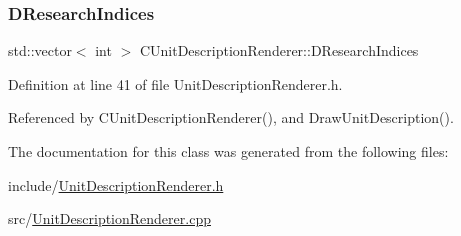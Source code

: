 \hypertarget{classCUnitDescriptionRenderer_aa34762a0be929d92ac9f0b151e3e3187}{}\label{classCUnitDescriptionRenderer_aa34762a0be929d92ac9f0b151e3e3187} 
\subsubsection{\texorpdfstring{D\+Research\+Indices}{DResearchIndices}}
{\footnotesize\ttfamily std\+::vector$<$ int $>$ C\+Unit\+Description\+Renderer\+::\+D\+Research\+Indices\hspace{0.3cm}{\ttfamily [protected]}}



Definition at line 41 of file Unit\+Description\+Renderer.\+h.



Referenced by C\+Unit\+Description\+Renderer(), and Draw\+Unit\+Description().



The documentation for this class was generated from the following files\+:\begin{DoxyCompactItemize}
\item 
include/\hyperlink{UnitDescriptionRenderer_8h}{Unit\+Description\+Renderer.\+h}\item 
src/\hyperlink{UnitDescriptionRenderer_8cpp}{Unit\+Description\+Renderer.\+cpp}\end{DoxyCompactItemize}

